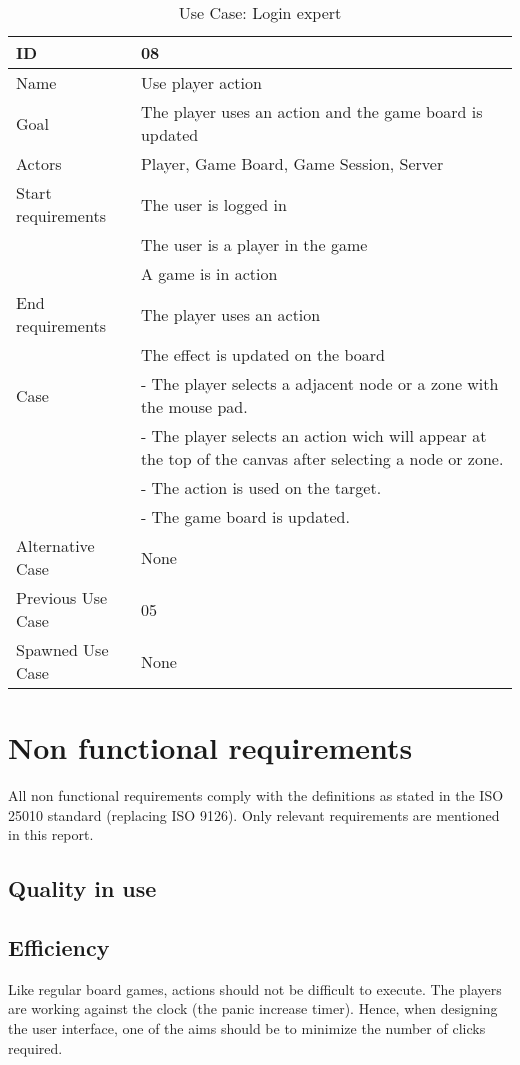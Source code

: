 \begin{table}[H]
\begin{tabular}{|l|l|}
\hline
	\textbf{ID} & \textbf{08}\\ \hline
	Name & Use player action \\ \hline
	Goal & The player uses an action and the game board is updated\\ \hline
	Actors & Player, Game Board, Game Session, Server \\ \hline
	Start requirements & The user is logged in \\
				& The user is a player in the game\\
				& A game is in action\\ \hline
	End requirements & The player uses an action \\
				& The effect is updated on the board \\ \hline
	Case &- The player selects a adjacent node or a zone with the mouse pad.\\
		&- The player selects an action wich will appear at the top of the canvas after selecting a node or zone.\\
		&- The action is used on the target.\\
		&- The game board is updated.\\ \hline
	Alternative Case & None\\ \hline
	Previous Use Case & 05\\ \hline
	Spawned Use Case & None\\ \hline
\end{tabular}
\caption{Use Case: Login expert}
\label{fig:usecase08table}
\end{table}



\section{Non functional requirements} 


All non functional requirements comply with the definitions as stated in the ISO 25010 standard (replacing ISO 9126). Only relevant requirements are mentioned in this report.

\subsection{Quality in use}

\subsection{Efficiency}
Like regular board games, actions should not be difficult to execute. The players are working against the clock (the panic increase timer). Hence, when designing the user interface, one of the aims should be to minimize the number of clicks required.

